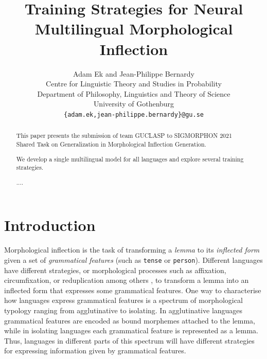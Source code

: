 \documentclass[11pt,a4paper]{article}
\title{Training Strategies for Neural Multilingual Morphological Inflection}
\author{Adam Ek and Jean-Philippe Bernardy \\
	Centre for Linguistic Theory and Studies in Probability \\
	Department of Philosophy, Linguistics and Theory of Science \\
	University of Gothenburg \\
	\texttt{\{adam.ek,jean-philippe.bernardy\}@gu.se} \\}
\date{}
\newcommand\jp[1]{\textbf{JP: #1}}
\begin{document}
\maketitle
\begin{abstract}
This paper presents the submission of team GUCLASP to SIGMORPHON
2021 Shared Task on Generalization in Morphological Inflection
Generation. 

We develop a single multilingual model for all languages and explore
several training strategies.

....
\end{abstract}

\section{Introduction}


Morphological inflection is the task of transforming a \emph{lemma} to
its \emph{inflected form} given a set of \emph{grammatical features}
(such as \texttt{tense} or \texttt{person}).  Different languages have
different strategies, or morphological processes such as affixation,
circumfixation, or reduplication among others
\cite{haspelmath2013understanding}, to transform a lemma into an
inflected form that expresses some grammatical features.  One way to
characterise how languages express grammatical features is a spectrum
of morphological typology ranging from agglutinative to isolating. In
agglutinative languages grammatical features are encoded as bound
morphemes attached to the lemma, while in isolating languages each
grammatical feature is represented as a lemma. Thus, languages in
different parts of this spectrum will have different strategies for
expressing information given by grammatical features.




\end{document}
